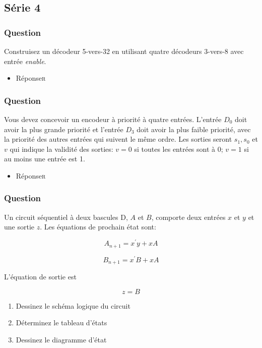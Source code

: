 \documentclass[11pt]{article}
\begin{document}
\subsection*{Série 4}
\label{sec:orge07205a}
\subsubsection*{Question}
\label{sec:orgcf631a4}
Construisez un décodeur 5-vers-32 en utilisant quatre décodeurs
  3-vers-8 avec entrée \emph{enable}.

\begin{itemize}
\item Réponse\hfill{}\textsc{r}
\label{sec:org3c4c5c3}
\end{itemize}

\subsubsection*{Question}
\label{sec:org34550ad}
Vous devez concevoir un encodeur à priorité à quatre
  entrées. L'entrée \(D_0\) doit avoir la plus grande priorité et
  l'entrée \(D_3\) doit avoir la plus faible priorité, avec la
  priorité des autres entrées qui suivent le même ordre. Les sorties
  seront \(s_1, s_0\) et \(v\) qui indique la validité des sorties:
  \(v=0\) si toutes les entrées sont à 0; \(v=1\) si au moins une
  entrée est 1.

\begin{itemize}
\item Réponse\hfill{}\textsc{r}
\label{sec:org568b185}
\end{itemize}

\subsubsection*{Question}
\label{sec:org83f8eb1}
Un circuit séquentiel à deux bascules D, \(A\) et \(B\), comporte
  deux entrées \(x\) et \(y\) et une sortie \(z\). Les équations de
  prochain état sont:

$$A_{n+1} = x^\prime y + x A$$

$$B_{n+1} = x^\prime B + x A$$

L'équation de sortie est 

$$z=B$$

\begin{enumerate}
\item Dessinez le schéma logique du circuit

\item Déterminez le tableau d'états

\item Dessinez le diagramme d'état
\end{enumerate}
\end{document}
